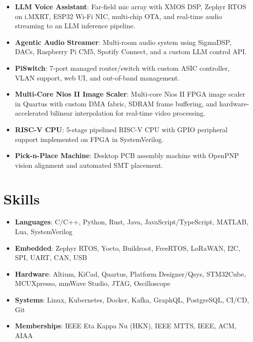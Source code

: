\documentclass[letterpaper,12pt]{article}
\newcommand{\resumeItem}[2]{
  \item\small{
    \textbf{#1}{: #2 \vspace{-2pt}}
  }
}
\newcommand{\resumeSubItem}[2]{
  \resumeItem{#1}{#2}\vspace{-6pt}
}
\newcommand{\resumeSubHeadingListStart}{
\begin{itemize}[leftmargin=*,label={}]
}
\newcommand{\resumeSubHeadingListEnd}{
\end{itemize}
}
\begin{document}
\resumeSubHeadingListStart

\resumeSubItem
{LLM Voice Assistant}
{Far-field mic array with XMOS DSP, Zephyr RTOS on i.MXRT, ESP32 Wi-Fi NIC, multi-chip OTA, and real-time audio streaming to an LLM inference pipeline.}

\resumeSubItem
{Agentic Audio Streamer}
{Multi-room audio system using SigmaDSP, DACs, Raspberry Pi CM5, Spotify Connect, and a custom LLM control API.}

\resumeSubItem
{PiSwitch}
{7-port managed router/switch with custom ASIC controller, VLAN support, web UI, and out-of-band management.}

\resumeSubItem
{Multi-Core Nios II Image Scaler}
{Multi-core Nios II FPGA image scaler in Quartus with custom DMA fabric, SDRAM frame buffering, and hardware-accelerated bilinear interpolation for real-time video processing.}

\resumeSubItem
{RISC-V CPU}
{5-stage pipelined RISC-V CPU with GPIO peripheral support implemented on FPGA in SystemVerilog.}

\resumeSubItem
{Pick-n-Place Machine}
{Desktop PCB assembly machine with OpenPNP vision alignment and automated SMT placement.}

\resumeSubHeadingListEnd


\vspace{0.5pt}
\section{Skills}

\resumeSubHeadingListStart

\resumeSubItem
{Languages}
{C/C++, Python, Rust, Java, JavaScript/TypeScript, MATLAB, Lua, SystemVerilog}

\resumeSubItem
{Embedded}
{Zephyr RTOS, Yocto, Buildroot, FreeRTOS, LoRaWAN, I2C, SPI, UART, CAN, USB}

\resumeSubItem
{Hardware}
{Altium, KiCad, Quartus, Platform Designer/Qsys, STM32Cube, MCUXpresso, mmWave Studio, JTAG, Oscilloscope}

\resumeSubItem
{Systems}
{Linux, Kubernetes, Docker, Kafka, GraphQL, PostgreSQL, CI/CD, Git}

\resumeSubItem
{Memberships}
{IEEE Eta Kappa Nu (HKN), IEEE MTTS, IEEE, ACM, AIAA}

\resumeSubHeadingListEnd

\end{document}
